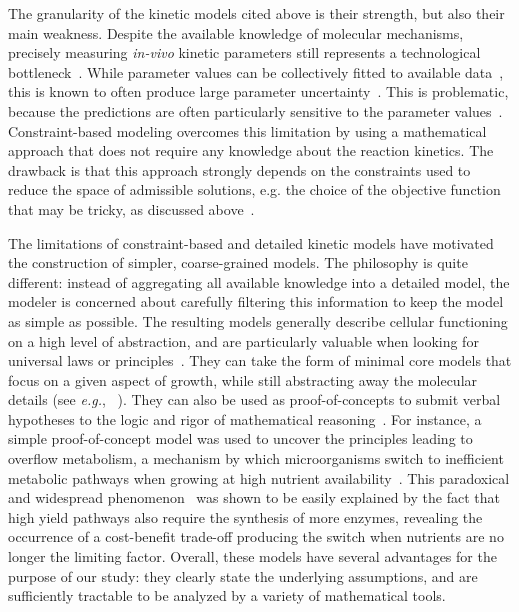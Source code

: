 The granularity of the kinetic models cited above is their strength, but also their main weakness.
Despite the available knowledge of molecular mechanisms, precisely measuring \textit{in-vivo} kinetic parameters still represents a technological bottleneck~\cite{park_metabolite_2016,bennett_absolute_2009,buscher_cross-platform_2009}.
While parameter values can be collectively fitted to available data~\cite{jaqaman_linking_2006,mendes_non-linear_1998}, this is known to often produce large parameter uncertainty~\cite{cho_experimental_2003,brodersen_characterization_1987,rodriguez-fernandez_hybrid_2006}.
This is problematic, because the predictions are often particularly sensitive to the parameter values~\cite{gutenkunst_universally_2007,ingram_network_2006,mayo_plasticity_2006}.
Constraint-based modeling overcomes this limitation by using a mathematical approach that does not require any knowledge about the reaction kinetics.
The drawback is that this approach strongly depends on the constraints used to reduce the space of admissible solutions, e.g. the choice of the objective function that may be tricky, as discussed above~\cite{kauffman_advances_2003}.

The limitations of constraint-based and detailed kinetic models have motivated the construction of simpler, coarse-grained models.
The philosophy is quite different: instead of aggregating all available knowledge into a detailed model, the modeler is concerned about carefully filtering this information to keep the model as simple as possible.
The resulting models generally describe cellular functioning on a high level of abstraction, and are particularly valuable when looking for universal laws or principles~\cite{scott_bacterial_2011,scott_interdependence_2010,scott_emergence_2014}.
They can take the form of minimal core models that focus on a given aspect of growth, while still abstracting away the molecular details (see \textit{e.g.}, ~\cite{spiesser_size_2012}).
They can also be used as proof-of-concepts to submit verbal hypotheses to the logic and rigor of mathematical reasoning~\cite{servedio_not_2014}.
For instance, a simple proof-of-concept model was used to uncover the principles leading to overflow metabolism, a mechanism by which microorganisms switch to inefficient metabolic pathways when growing at high nutrient availability~\cite{molenaar_shifts_2009}.
This paradoxical and widespread phenomenon~\cite{dijken_kinetics_1993,vemuri_overflow_2006,mckeehan_glycolysis_1982,hsu_cancer_2008} was shown to be easily explained by the fact that high yield pathways also require the synthesis of more enzymes, revealing the occurrence of a cost-benefit trade-off producing the switch when nutrients are no longer the limiting factor.
Overall, these models have several advantages for the purpose of our study: they clearly state the underlying assumptions, and are sufficiently tractable to be analyzed by a variety of mathematical tools.

